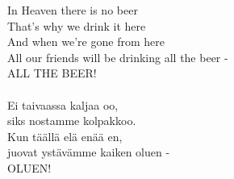 
In Heaven there is no beer \\ That's why we drink it here \\ And when we're gone from here \\ All our friends will be drinking all the beer - \\ ALL THE BEER! \\ \hspace{10mm} \\ Ei taivaassa kaljaa oo, \\ siks nostamme kolpakkoo. \\ Kun täällä elä enää en, \\ juovat ystävämme kaiken oluen - \\ OLUEN!